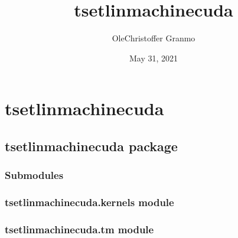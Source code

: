 \documentclass[letterpaper,10pt,english]{sphinxmanual}
\title{tsetlinmachinecuda}
\date{May 31, 2021}
\author{Ole\sphinxhyphen{}Christoffer Granmo}
\begin{document}
\pagestyle{empty}
\sphinxmaketitle
\pagestyle{plain}
\sphinxtableofcontents
\pagestyle{normal}
\label{\detokenize{index::doc}}



\chapter{tsetlinmachinecuda}
\label{\detokenize{source/modules:tsetlinmachinecuda}}\label{\detokenize{source/modules::doc}}

\section{tsetlinmachinecuda package}
\label{\detokenize{source/tsetlinmachinecuda:tsetlinmachinecuda-package}}\label{\detokenize{source/tsetlinmachinecuda::doc}}

\subsection{Submodules}
\label{\detokenize{source/tsetlinmachinecuda:submodules}}

\subsection{tsetlinmachinecuda.kernels module}
\label{\detokenize{source/tsetlinmachinecuda:module-tsetlinmachinecuda.kernels}}\label{\detokenize{source/tsetlinmachinecuda:tsetlinmachinecuda-kernels-module}}

\subsection{tsetlinmachinecuda.tm module}
\label{\detokenize{source/tsetlinmachinecuda:module-tsetlinmachinecuda.tm}}\label{\detokenize{source/tsetlinmachinecuda:tsetlinmachinecuda-tm-module}}
\end{document}
